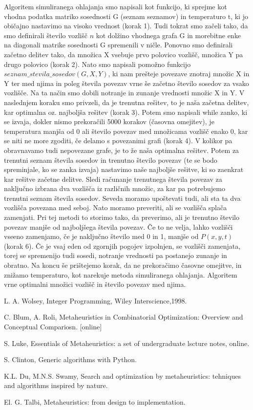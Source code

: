 \documentclass[12pt,a4paper]{amsart}
\theoremstyle{definition} %
\theoremstyle{plain} %
\begin{document}
Algoritem simuliranega ohlajanja smo napisali kot funkcijo, ki sprejme kot vhodna podatka matriko sosednosti G (seznam seznamov) in temperaturo t, ki jo običajno nastavimo na visoko vrednost (korak 1). Tudi tokrat smo začeli tako, da smo definirali število vozlišč $n$ kot dolžino vhodnega grafa G in morebitne enke na diagonali matrike sosednosti G spremenili v ničle. Ponovno smo definirali začetno delitev tako, da množica X vsebuje prvo polovico vozlišč, množica Y pa drugo polovico (korak 2). Nato smo napisali pomožno funkcijo $seznam\_stevila\_sosedov(G,X,Y)$, ki nam prešteje povezave znotraj množic X in Y ter med njima in poleg števila povezav vrne še začetno število sosedov za vsako vozlišče. Na ta način smo dobili notranje in zunanje vrednosti množic X in Y. V naslednjem koraku smo privzeli, da je trenutna rešitev, to je naša začetna delitev, kar optimalna oz. najboljša rešitev (korak 3). Potem  smo napisali while zanko, ki se izvaja, dokler nismo prekoračili 5000 korakov (časovna omejitev), je temperatura manjša od 0 ali število povezav med množicama vozlišč enako 0, kar se niti ne more zgoditi, če delamo s povezanimi grafi (korak 4). V kolikor pa obravnavamo tudi nepovezane grafe, je to že naša optimalna rešitev. Potem za trenutni seznam števila sosedov in trenutno število povezav (te se bodo spreminjale, ko se zanka izvaja) nastavimo naše najboljše rešitve, ki so zaenkrat kar rešitve začetne delitve. Sledi računanje trenutnega števila povezav za naključno izbrana dva vozlišča iz različnih množic, za kar pa potrebujemo trenutni seznam števila sosedov. Seveda moramo upoštevati tudi, ali sta ta dva vozlišča povezana med seboj. Nato moramo preveriti, ali se vozlišča splača zamenjati. Pri tej metodi to storimo tako, da preverimo, ali je trenutno število povezav manjše od najboljšega števila povezav. Če to ne velja, lahko vozlišči vseeno zamenjamo, če je naključno število med 0 in 1, manjše od $P(x,y,t)$ (korak 6). Če je vsaj eden od zgornjih pogojev izpolnjen, se vozlišči zamenjata, torej se spremenijo tudi sosedi, notranje vrednosti pa postanejo zunanje in obratno. Na koncu še prištejemo korak, da ne prekoračimo časovne omejitve, in znižamo temperaturo, kot narekuje metoda simuliranega ohlajanja. Algoritem vrne optimalni množici vozlišč in število povezav med njima.

\newpage

\begin{thebibliography}{9}
L. A. Wolsey, Integer Programming, Wiley Interscience,1998. 

 
C. Blum, A. Roli, Metaheuristics in Combinatorial Optimization: Overview and Conceptual Compariosn. [online]
 
S. Luke, Essentials of Metaheuristics: a set of undergraduate lscture notes, online. 

S. Clinton, Generic algorithms with Python.

K.L. Du, M.N.S. Swamy, Search and optimization by metaheuristics: tehniques and algorithms inspired by nature. 


El. G. Talbi, Metaheuristics: from design to implementation.

\end{thebibliography}
\end{document}
